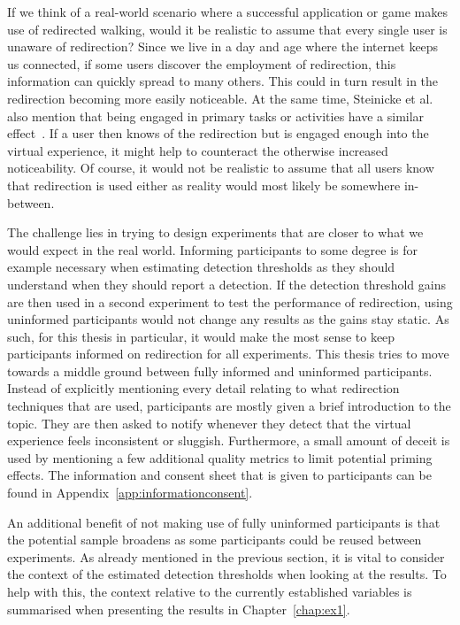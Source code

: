 If we think of a real-world scenario where a successful application or game makes use of redirected walking, would it be realistic to assume that every single user is unaware of redirection? Since we live in a day and age where the internet keeps us connected, if some users discover the employment of redirection, this information can quickly spread to many others. This could in turn result in the redirection becoming more easily noticeable. At the same time, Steinicke et al. also mention that being engaged in primary tasks or activities have a similar effect~\cite{5072212}. If a user then knows of the redirection but is engaged enough into the virtual experience, it might help to counteract the otherwise increased noticeability. Of course, it would not be realistic to assume that all users know that redirection is used either as reality would most likely be somewhere in-between. 
 
The challenge lies in trying to design experiments that are closer to what we would expect in the real world. Informing participants to some degree is for example necessary when estimating detection thresholds as they should understand when they should report a detection. If the detection threshold gains are then used in a second experiment to test the performance of redirection, using uninformed participants would not change any results as the gains stay static. As such, for this thesis in particular, it would make the most sense to keep participants informed on redirection for all experiments. This thesis tries to move towards a middle ground between fully informed and uninformed participants. Instead of explicitly mentioning every detail relating to what redirection techniques that are used, participants are mostly given a brief introduction to the topic. They are then asked to notify whenever they detect that the virtual experience feels inconsistent or sluggish. Furthermore, a small amount of deceit is used by mentioning a few additional quality metrics to limit potential priming effects. The information and consent sheet that is given to participants can be found in Appendix~\ref{app:informationconsent}.

An additional benefit of not making use of fully uninformed participants is that the potential sample broadens as some participants could be reused between experiments. As already mentioned in the previous section, it is vital to consider the context of the estimated detection thresholds when looking at the results. To help with this, the context relative to the currently established variables is summarised when presenting the results in Chapter~\ref{chap:ex1}. 

